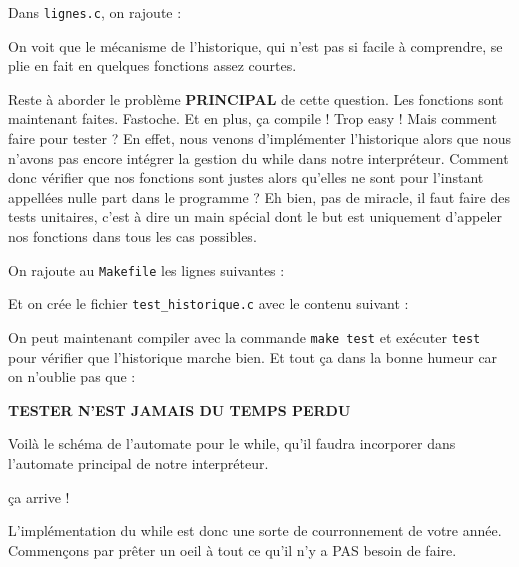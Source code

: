 \documentclass[10pt]{article}
\begin{document}
\begin{enumerate}[label=\textbf{[\alph*]}]
  

  \vspace{0.2cm}
  Dans \texttt{lignes.c}, on rajoute :

  

  On voit que le mécanisme de l'historique, qui n'est pas si facile à
  comprendre, se plie en fait en quelques fonctions assez courtes.

  \vspace{0.2cm}
  Reste à aborder le problème \textbf{PRINCIPAL} de cette
  question. Les fonctions sont maintenant faites. Fastoche. Et en
  plus, ça compile ! Trop easy ! Mais comment faire pour tester ? En
  effet, nous venons d'implémenter l'historique alors que nous n'avons
  pas encore intégrer la gestion du while dans notre
  interpréteur. Comment donc vérifier que nos fonctions sont justes
  alors qu'elles ne sont pour l'instant appellées nulle part dans le
  programme ? Eh bien, pas de miracle, il faut faire des tests
  unitaires, c'est à dire un main spécial dont le but est uniquement
  d'appeler nos fonctions dans tous les cas possibles.

  \vspace{0.2cm}
  On rajoute au \texttt{Makefile} les lignes suivantes :

  

  \vspace{0.2cm}
  Et on crée le fichier \texttt{test\_historique.c} avec le contenu
  suivant :

  

  On peut maintenant compiler avec la commande \texttt{make test} et
  exécuter \texttt{test} pour vérifier que l'historique marche
  bien. Et tout ça dans la bonne humeur car on n'oublie pas que :

  \begin{center}
    {\large {\bf TESTER N'EST JAMAIS DU TEMPS PERDU}}
  \end{center}
  \newpage

\item Voilà le schéma de l'automate pour le while, qu'il faudra
  incorporer dans l'automate principal de notre interpréteur.

  \begin{center}
    ça arrive !
  \end{center}

\item L'implémentation du while est donc une sorte de courronnement de
  votre année. Commençons par prêter un oeil à tout ce qu'il n'y a PAS
  besoin de faire.


\end{enumerate}
\end{document}
